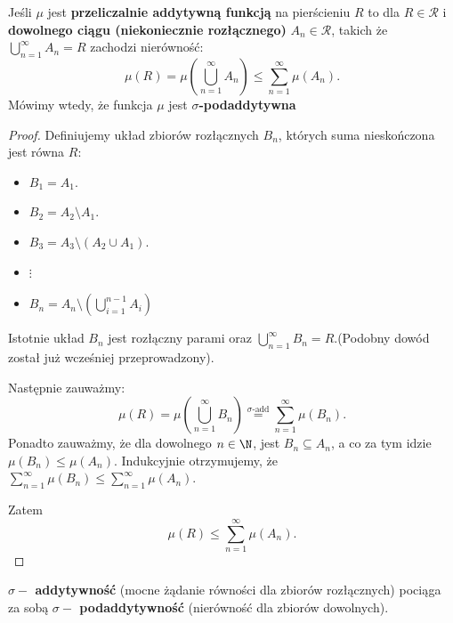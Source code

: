 \begin{lemma}
	Jeśli $\mu $ jest \textbf{przeliczalnie addytywną funkcją} na pierścieniu $R$ to dla $R\in \mathcal{R}$ i \textbf{dowolnego ciągu (niekoniecznie rozłącznego)}  $A_{n}\in \mathcal{R}$, takich że $\bigcup_{n=1} ^{\infty}A_{n} = R$ zachodzi nierówność:
	\[
	\mu\left( R \right) = \mu \left( \bigcup_{n=1} ^{\infty}A_{n} \right) \le \sum_{n=1}^{\infty} \mu \left( A_{n} \right) 
	.\] 
	Mówimy wtedy, że funkcja $\mu$ jest  $\sigma$\textbf{-podaddytywna} 
\end{lemma} 
\begin{proof}
	Definiujemy układ zbiorów rozłącznych $B_{n}$, których suma nieskończona jest równa $R$:
	 \begin{itemize}
		 \item $B_1 = A_1$.
		 \item $B_2 = A_2\setminus A_1$.
		 \item $B_{3} = A_{3} \setminus \left( A_2\cup A_1 \right) $.
		 \item $\vdots$
		 \item  $B_{n} = A_{n}\setminus \left(\bigcup_{i=1} ^{n-1}A_{i}\right)$
	\end{itemize}
	Istotnie układ $B_{n}$ jest rozłączny parami oraz $\bigcup_{n=1} ^{\infty}B_{n} = R$.(Podobny dowód został już wcześniej przeprowadzony).

	Następnie zauważmy:
	\[
	\mu\left( R \right) = \mu\left( \bigcup_{n=1} ^{\infty}B_{n} \right) \overset{\sigma\text{-add}}{=} \sum_{n=1}^{\infty} \mu\left( B_{n} \right) 
	.\] 
	Ponadto zauważmy, że dla dowolnego $n\in \N$, jest $B_{n}\subseteq A_{n}$, a co za tym idzie $\mu\left( B_{n} \right) \le  \mu\left( A_{n} \right) $. Indukcyjnie otrzymujemy, że $\sum_{n = 1}^{\infty} \mu\left( B_{n} \right) \le  \sum_{n = 1}^{\infty} \mu\left( A_{n} \right) $.

	Zatem 
	\[
	\mu\left( R \right) \le \sum_{n = 1}^{\infty} \mu\left( A_{n} \right) 
	.\] 
\end{proof} 
\begin{corollary}
	\textbf{$\sigma-$ addytywność} (mocne żądanie równości dla zbiorów rozłącznych) pociąga za sobą \textbf{$\sigma-$ podaddytywność} (nierówność dla zbiorów dowolnych).
\end{corollary}

